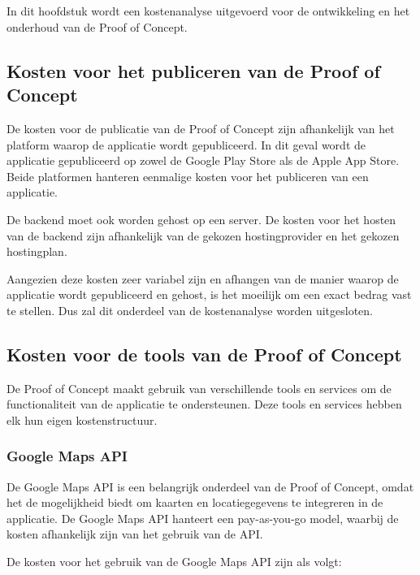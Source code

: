 \chapter{}%
\label{ch:kostenanalyse}

In dit hoofdstuk wordt een kostenanalyse uitgevoerd voor de ontwikkeling en het onderhoud van de Proof of Concept.

\section{Kosten voor het publiceren van de Proof of Concept}%

De kosten voor de publicatie van de Proof of Concept zijn afhankelijk van het platform waarop de applicatie wordt gepubliceerd. In dit geval wordt de applicatie gepubliceerd op zowel de Google Play Store als de Apple App Store. Beide platformen hanteren eenmalige kosten voor het publiceren van een applicatie.

De backend moet ook worden gehost op een server. De kosten voor het hosten van de backend zijn afhankelijk van de gekozen hostingprovider en het gekozen hostingplan. 

Aangezien deze kosten zeer variabel zijn en afhangen van de manier waarop de applicatie wordt gepubliceerd en gehost, is het moeilijk om een exact bedrag vast te stellen. Dus zal dit onderdeel van de kostenanalyse worden uitgesloten.

\section{Kosten voor de tools van de Proof of Concept}%

De Proof of Concept maakt gebruik van verschillende tools en services om de functionaliteit van de applicatie te ondersteunen. Deze tools en services hebben elk hun eigen kostenstructuur.

\subsection{Google Maps API}%

De Google Maps API is een belangrijk onderdeel van de Proof of Concept, omdat het de mogelijkheid biedt om kaarten en locatiegegevens te integreren in de applicatie. De Google Maps API hanteert een pay-as-you-go model, waarbij de kosten afhankelijk zijn van het gebruik van de API.

De kosten voor het gebruik van de Google Maps API zijn als volgt:

